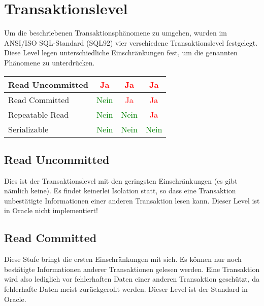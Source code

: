     \section{Transaktionslevel}
      Um die beschriebenen Transaktionsphänomene zu umgehen, wurden im ANSI/ISO SQL-Standard (SQL92) vier verschiedene Transaktionslevel festgelegt. Diese Level legen unterschiedliche Einschränkungen fest, um die genannten Phänomene zu unterdrücken.
\clearpage
      \begin{small}
        \begin{supertabular}{|l|c|c|c|}
          Read Uncommitted & \textcolor{red}{Ja} & \textcolor{red}{Ja} & \textcolor{red}{Ja} \\
          \hline
          Read Committed & \textcolor{green}{Nein} & \textcolor{red}{Ja} & \textcolor{red}{Ja} \\
          \hline
          Repeatable Read & \textcolor{green}{Nein} & \textcolor{green}{Nein} & \textcolor{red}{Ja} \\
          \hline
          Serializable & \textcolor{green}{Nein} & \textcolor{green}{Nein} & \textcolor{green}{Nein}  \\
          \hline
        \end{supertabular}
      \end{small}
      \subsection{Read Uncommitted}
        Dies ist der Transaktionslevel mit den geringsten Einschränkungen (es gibt nämlich keine). Es findet keinerlei Isolation statt, so dass eine Transaktion unbestätigte Informationen einer anderen Transaktion lesen kann. Dieser Level ist in Oracle nicht implementiert!
      \subsection{Read Committed}
        Diese Stufe bringt die ersten Einschränkungen mit sich. Es können nur noch bestätigte Informationen anderer Transaktionen gelesen werden. Eine Transaktion wird also lediglich vor fehlerhaften Daten einer anderen Transaktion geschützt, da fehlerhafte Daten meist zurückgerollt werden. Dieser Level ist der Standard in Oracle.
